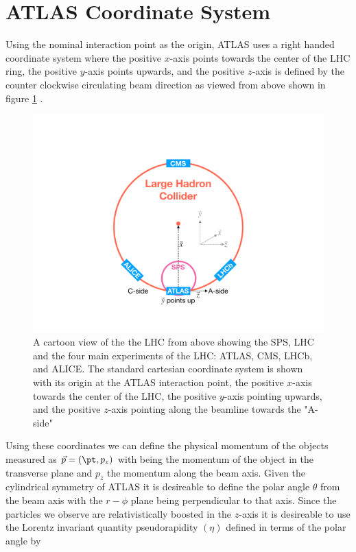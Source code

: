 \section{ATLAS Coordinate System} \label{sec:atlas:coordinates}

Using the nominal interaction point as the origin, ATLAS uses a right handed
coordinate system where the positive $x$-axis points towards the center of the
LHC ring, the positive $y$-axis points upwards, and the positive $z$-axis is
defined by the counter clockwise circulating beam direction as viewed from
above shown in figure \ref{fig:atlas_geometry} \cite{PERF-2007-01}.  
 
\begin{figure}[!htbp]
  \begin{center}
    \includegraphics[width=0.5\linewidth]{figures/atlas/atlas_geometry}
    \caption{ \cite{Stark:2317296} A cartoon view of the the LHC from above
showing the SPS, LHC and the four main experiments of the LHC: ATLAS, CMS, LHCb,
and ALICE.  The standard cartesian coordinate system is shown with its origin at
the ATLAS interaction point, the positive $x$-axis towards the center of the
LHC, the positive $y$-axis pointing upwards, and the positive $z$-axis pointing
along the beamline towards the "A-side"}
    \label{fig:atlas_geometry}
  \end{center}
\end{figure}

Using these coordinates we can define the physical momentum of the objects
measured as $\vec{p} = (\pt,p_z)$ with \pt being the momentum of the object in
the transverse plane and $p_z$ the momentum along the beam axis. Given the
cylindrical symmetry of ATLAS it is desireable to define the polar angle
$\theta$ from the beam axis with the $r-\phi$ plane being perpendicular to that
axis. Since the particles we observe are relativistically boosted in the
$z$-axis it is desireable to use the Lorentz invariant quantity pseudorapidity
$(\eta)$ defined in terms of the polar angle by

